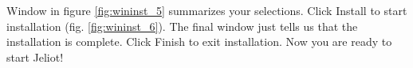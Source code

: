 \documentclass[a4paper,11pt,english]{article}
\newcommand{\jel}{Jeliot}
\newcommand{\bu}[1]{\textsf{#1}}
\begin{document}
Window in figure \ref{fig:wininst_5} summarizes your selections. Click \bu{Install} to start installation (fig. \ref{fig:wininst_6}). The final window just tells us that the installation is complete. Click \bu{Finish} to exit installation. Now you are ready to start \jel{}!

\begin{figure}[htp]
\begin{center}
 \\

\end{center}
\end{figure}
\end{document}
